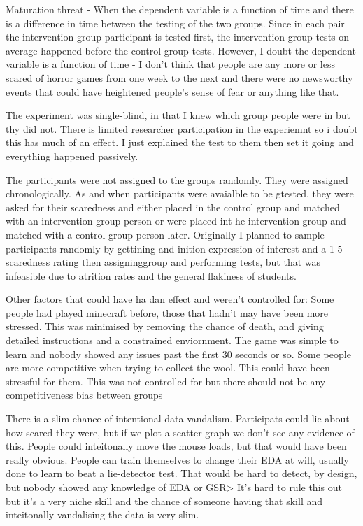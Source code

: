 \documentclass[12pt,a4paper]{article}\usepackage[]{graphicx}\usepackage[]{color}
\begin{document}
Maturation threat - When the dependent variable is a function of time and there is a difference in time between the testing of the two groups. Since in each pair the intervention group participant is tested first, the intervention group tests on average happened before the control group tests. However, I doubt the dependent variable is a function of time - I don't think that people are any more or less scared of horror games from one week to the next and there were no newsworthy events that could have heightened people's sense of fear or anything like that.

The experiment was single-blind, in that I knew which group people were in but thy did not. There is limited researcher participation in the experiemnt so i doubt this has much of an effect. I just explained the test to them then set it going and everything happened passively.

The participants were not assigned to the groups randomly. They were assigned chronologically. As and when participants were avaialble to be gtested, they were asked for their scaredness and either placed in the control group and matched with an intervention group person or were placed int he intervention group and matched with a control group person later. Originally I planned to sample participants randomly by gettining and inition expression of interest and a 1-5 scaredness rating then assigninggroup and performing tests, but that was infeasible due to atrition rates and the general flakiness of students.

Other factors that could have ha dan effect and weren't controlled for:
Some people had played minecraft before, those that hadn't may have been more stressed. This was minimised by removing the chance of death, and giving detailed instructions and a constrained enviornment. The game was simple to learn and nobody showed any issues past the first 30 seconds or so.
Some people are more competitive when trying to collect the wool. This could have been stressful for them. This was not controlled for but there should not be any competitiveness bias between groups

There is a slim chance of intentional data vandalism. Participats could lie about how scared they were, but if we plot a scatter graph we don't see any evidence of this. %
People could inteitonally move the mouse loads, but that would have been really obvious.
People can train themselves to change their EDA at will, usually done to learn to beat a lie-detector test. That would be hard to detect, by design, but nobody showed any knowledge of EDA or GSR> It's hard to rule this out but it's a very niche skill and the chance of someone having that skill and inteitonally vandalising the data is very slim.
\end{document}

